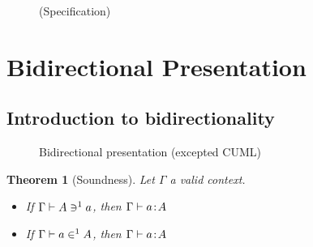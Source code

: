 \documentclass[preprint
              , authoryear
              , onecolumn
              ]{sigplanconf}
\newtheorem{theorem}{Theorem}
\begin{document}

\begin{figure}[htb]

\begin{center}

\end{center}

\caption{\ECC (Specification)}

\end{figure}




\section{Bidirectional Presentation}

\subsection{Introduction to bidirectionality}


\begin{figure}[p]

\begin{center}

\end{center}

\caption{Bidirectional presentation (excepted CUML)}

\end{figure}


\begin{theorem}[Soundness]

Let $\Gamma$ a valid context.

\begin{itemize}
\item If \xspace $\Gamma \vdash \pushN{a}{1}{A}$, then $\Gamma \vdash \Bhab{a}{A}$
\item If \xspace $\Gamma \vdash \pullN{a}{1}{A}$, then $\Gamma \vdash \Bhab{a}{A}$
\end{itemize}

\end{theorem}
\end{document}
